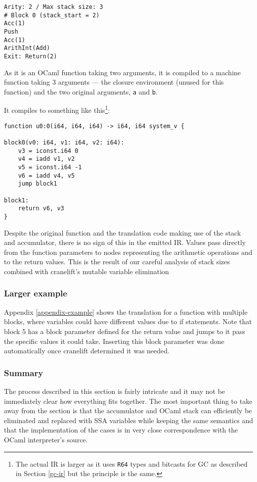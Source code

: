 \begin{verbatim}
Arity: 2 / Max stack size: 3
# Block 0 (stack_start = 2)
Acc(1)
Push
Acc(1)
ArithInt(Add)
Exit: Return(2)
\end{verbatim}

As it is an OCaml function taking two arguments, it is compiled to a machine function taking 3
arguments --- the closure environment (unused for this function) and the two original arguments,
\texttt{a} and \texttt{b}.

It compiles to something like this\footnote{The actual IR is larger as it uses \texttt{R64} types
      and bitcasts for GC as
      described in Section \ref{gc-ir} but the principle is the same.}:

\begin{verbatim}
function u0:0(i64, i64, i64) -> i64, i64 system_v {

block0(v0: i64, v1: i64, v2: i64):
    v3 = iconst.i64 0
    v4 = iadd v1, v2
    v5 = iconst.i64 -1
    v6 = iadd v4, v5
    jump block1

block1:
    return v6, v3
}
\end{verbatim}

Despite the original function and the translation code making use of the stack and accumulator,
there is no sign of this in the emitted IR. Values pass directly from the function parameters to
nodes representing the arithmetic operations and to the return values. This is the result of our
careful analysis of stack sizes combined with cranelift's mutable variable elimination

\subsubsection{Larger example}

Appendix \ref{appendix-example} shows the translation for a function with multiple blocks, where
variables could have different values due to if statements.  Note that block 5 has a block
parameter defined for the return value and jumps to it pass the specific values it could take.
Inserting this block parameter was done automatically once cranelift determined it was needed.

\subsubsection{Summary}

The process described in this section is fairly intricate and it may not be immediately clear how
everything fits together. The most important thing to take away from the section is that the
accumulator and OCaml stack can efficiently be eliminated and replaced with SSA variables while
keeping the same semantics and that the implementation of the cases is in very close correspondence
with the OCaml interpreter's source.

